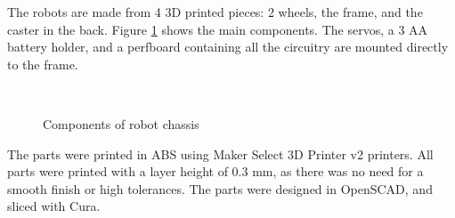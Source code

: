 \documentclass[]{article}
\begin{document}

The robots are made from 4 3D printed pieces: 2 wheels, the frame, and
the caster in the back.
Figure \ref{fig:robotchassis} shows the main components.
The servos, a 3 AA battery holder, and a perfboard containing all the circuitry are mounted directly to the frame.

\begin{figure}
  \centering
  \\
  \caption{Components of robot chassis}
  \label{fig:robotchassis}
\end{figure}

The parts were printed in ABS using Maker Select 3D Printer v2 printers.
All parts were printed with a layer height of 0.3 mm, as there was no need for a smooth finish or high tolerances.
The parts were designed in OpenSCAD, and sliced with Cura.
\end{document}
